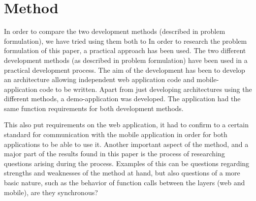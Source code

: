 \documentclass{cslthse-msc}
\begin{document}
\section{Method}
In order to compare the two development methods (described in problem formulation), we have tried using them both to 
In order to research the problem formulation of this paper, a practical approach has been used. The two different development methods (as described in problem formulation) have been used in a practical development process. The aim of the development has been to develop an architecture allowing independent web application code and mobile-application code to be written.
\newline\newline
Apart from just developing architectures using the different methods, a demo-application was developed. The application had the same function requirements for both development methods. 

This also put requirements on the web application, it had to confirm to a certain standard for communication with the mobile application in order for both applications to be able to use it. 
\newline\newline
Another important aspect of the method, and a major part of the results found in this paper is the process of researching questions arising during the process. Examples of this can be questions regarding strengths and weaknesses of the method at hand, but also questions of a more basic nature, such as the behavior of function calls between the layers (web and mobile), are they synchronous?
\end{document}
